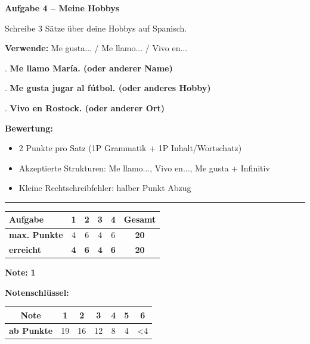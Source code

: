 \documentclass[11pt, a4paper]{article}
\newcommand{\fachfarbe}{spanisch}
\newcommand{\punktebox}[1]{\hfill\fbox{\small \_/#1}}
\newcommand{\lsg}[1]{\textcolor{loesung}{\textbf{#1}}}
\newenvironment{aufgabe}[1]{%
    \needspace{5\baselineskip}%
    \nopagebreak[4]%
    \vspace{10pt}
    \noindent\textbf{\textcolor{\fachfarbe}{Aufgabe #1}}
    \nopagebreak[4]%
    \vspace{5pt}
    \nopagebreak[4]%
    \begin{list}{}{\leftmargin=0pt}
    \item[]
}{%
    \end{list}
}
\begin{document}
\begin{aufgabe}{4 -- Meine Hobbys}
Schreibe 3 Sätze über deine Hobbys auf Spanisch. \punktebox{6}
\end{aufgabe}

\noindent
\textbf{Verwende:} Me gusta... / Me llamo... / Vivo en...

\vspace{0.8em}

. \lsg{Me llamo María. (oder anderer Name)}

\vspace{1em}

. \lsg{Me gusta jugar al fútbol. (oder anderes Hobby)}

\vspace{1em}

. \lsg{Vivo en Rostock. (oder anderer Ort)}

\vspace{1em}

\lsg{Bewertung:}
\begin{itemize}
    \item 2 Punkte pro Satz (1P Grammatik + 1P Inhalt/Wortschatz)
    \item Akzeptierte Strukturen: Me llamo..., Vivo en..., Me gusta + Infinitiv
    \item Kleine Rechtschreibfehler: halber Punkt Abzug
\end{itemize}


\vspace{25pt}
\hrule
\vspace{10pt}

\noindent
\begin{tabularx}{\textwidth}{|X|c|c|c|c||c|}
\hline
\textbf{Aufgabe} & 1 & 2 & 3 & 4 & \textbf{Gesamt} \\
\hline
\textbf{max. Punkte} & 4 & 6 & 4 & 6 & \textbf{20} \\
\hline
\textbf{erreicht} & \lsg{4} & \lsg{6} & \lsg{4} & \lsg{6} & \lsg{20} \\
\hline
\end{tabularx}

\vspace{10pt}

\begin{flushright}
\textbf{Note:} \lsg{1}
\end{flushright}

\vspace{1em}

\textbf{Notenschlüssel:}

\begin{tabular}{|c|c|c|c|c|c|c|}
\hline
\textbf{Note} & 1 & 2 & 3 & 4 & 5 & 6 \\
\hline
\textbf{ab Punkte} & 19 & 16 & 12 & 8 & 4 & <4 \\
\hline
\end{tabular}
\end{document}
